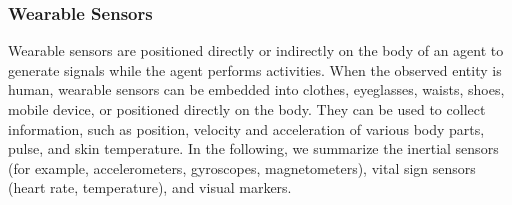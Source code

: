 \subsubsection{Wearable Sensors}

Wearable sensors are positioned directly or indirectly on the body of an agent to generate signals while the agent performs activities. When the observed entity is human, wearable sensors can be embedded into clothes, eyeglasses, waists, shoes, mobile device, or positioned directly on the body. They can be used to collect information, such as position, velocity and acceleration of various body parts, pulse, and skin temperature. In the following, we summarize the inertial sensors (for example, accelerometers, gyroscopes, magnetometers), vital sign sensors (heart rate, temperature), and visual markers.


